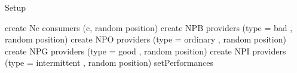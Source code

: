 
\begin{algorithm}[H]
\caption{Setup}
\begin{algorithmic}

\STATE create Nc consumers (c, random position)
\ENDFOR 
\STATE create NPB providers (type = bad , random position)
\STATE create NPO providers (type = ordinary , random position)
\STATE create NPG providers (type = good , random position)
\STATE create NPI providers (type = intermittent , random position)
\STATE setPerformances
\end{algorithmic}
\end{algorithm}
	







